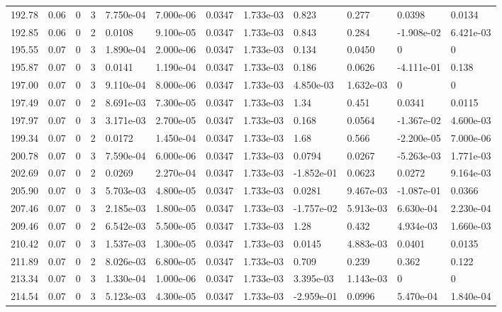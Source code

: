 \documentclass[preview]{standalone}
\begin{document}
{{{{{\begin{tabular}{L{1.2cm}C{1.2cm} C{0.3cm}C{0.5cm} C{1.4cm}C{1.4cm} C{1.4cm}C{1.4cm} C{1.6cm}C{1.6cm} C{1.6cm}C{1.6cm}}
  192.78  &  0.06  & 0     &  3 &  7.750e-04  & 7.000e-06  &  0.0347&   1.733e-03& 0.823 & 0.277   &  0.0398 & 0.0134  \\ 
  192.85  &  0.06  & 0     &  2 &  0.0108  & 9.100e-05  &  0.0347&   1.733e-03& 0.843 & 0.284   &  -1.908e-02 & 6.421e-03  \\ 
  195.55  &  0.07  & 0     &  3 &  1.890e-04  & 2.000e-06  &  0.0347&   1.733e-03& 0.134 & 0.0450   &  0 & 0  \\ 
  195.87  &  0.07  & 0     &  3 &  0.0141  & 1.190e-04  &  0.0347&   1.733e-03& 0.186 & 0.0626   &  -4.111e-01 & 0.138  \\ 
  197.00  &  0.07  & 0     &  3 &  9.110e-04  & 8.000e-06  &  0.0347&   1.733e-03& 4.850e-03 & 1.632e-03   &  0 & 0  \\ 
  197.49  &  0.07  & 0     &  2 &  8.691e-03  & 7.300e-05  &  0.0347&   1.733e-03& 1.34 & 0.451   &  0.0341 & 0.0115  \\ 
  197.97  &  0.07  & 0     &  3 &  3.171e-03  & 2.700e-05  &  0.0347&   1.733e-03& 0.168 & 0.0564   &  -1.367e-02 & 4.600e-03  \\ 
  199.34  &  0.07  & 0     &  2 &  0.0172  & 1.450e-04  &  0.0347&   1.733e-03& 1.68 & 0.566   &  -2.200e-05 & 7.000e-06  \\ 
  200.78  &  0.07  & 0     &  3 &  7.590e-04  & 6.000e-06  &  0.0347&   1.733e-03& 0.0794 & 0.0267   &  -5.263e-03 & 1.771e-03  \\ 
  202.69  &  0.07  & 0     &  2 &  0.0269  & 2.270e-04  &  0.0347&   1.733e-03& -1.852e-01 & 0.0623   &  0.0272 & 9.164e-03  \\ 
  205.90  &  0.07  & 0     &  3 &  5.703e-03  & 4.800e-05  &  0.0347&   1.733e-03& 0.0281 & 9.467e-03   &  -1.087e-01 & 0.0366  \\ 
  207.46  &  0.07  & 0     &  3 &  2.185e-03  & 1.800e-05  &  0.0347&   1.733e-03& -1.757e-02 & 5.913e-03   &  6.630e-04 & 2.230e-04  \\ 
  209.46  &  0.07  & 0     &  2 &  6.542e-03  & 5.500e-05  &  0.0347&   1.733e-03& 1.28 & 0.432   &  4.934e-03 & 1.660e-03  \\ 
  210.42  &  0.07  & 0     &  3 &  1.537e-03  & 1.300e-05  &  0.0347&   1.733e-03& 0.0145 & 4.883e-03   &  0.0401 & 0.0135  \\ 
  211.89  &  0.07  & 0     &  2 &  8.026e-03  & 6.800e-05  &  0.0347&   1.733e-03& 0.709 & 0.239   &  0.362 & 0.122  \\ 
  213.34  &  0.07  & 0     &  3 &  1.330e-04  & 1.000e-06  &  0.0347&   1.733e-03& 3.395e-03 & 1.143e-03   &  0 & 0  \\ 
  214.54  &  0.07  & 0     &  3 &  5.123e-03  & 4.300e-05  &  0.0347&   1.733e-03& -2.959e-01 & 0.0996   &  5.470e-04 & 1.840e-04  \\ 
\hline 
\end{tabular} 

}}}}}
\end{document}
